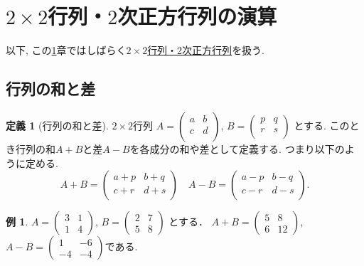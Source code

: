 \documentclass[dvipdfmx,a4paper,11pt]{article}
\theoremstyle{definition}
\newtheorem{dfn}[thm]{定義}
\newtheorem{exa}[thm]{例}
\begin{document}
\section{$2 \times 2$行列・$2$次正方行列の演算}
\label{sec-2}


以下, この\ref{sec-2}章ではしばらく\underline{$2 \times 2$行列・2次正方行列}を扱う. 

\subsection{行列の和と差}

 \begin{tcolorbox}[
    colback = white,
    colframe = green!35!black,
    fonttitle = \bfseries,
    breakable = true]
    \begin{dfn}[行列の和と差]
    \text{}
 
$2 \times 2$行列
$
A=\begin{pmatrix}
a& b \\
c& d \\
\end{pmatrix}
$, 
$
B=\begin{pmatrix}
p& q \\
r& s\\
\end{pmatrix}
$
とする.
このとき行列の和$A+B$と差$A-B$を各成分の和や差として定義する.
つまり以下のように定める. 
$$
A+B=
\begin{pmatrix}
a +p& b +q\\
c+r& d+s \\
\end{pmatrix}
\quad
A-B=
\begin{pmatrix}
a -p& b -q\\
c-r & d-s \\
\end{pmatrix}.
$$
  \end{dfn}
 \end{tcolorbox}
 

\begin{exa}
 $A = 
 \begin{pmatrix}
 3&1 \\
 1&4
 \end{pmatrix}
 $, 
 $
 B = 
 \begin{pmatrix}
 2&7\\
 5&8
 \end{pmatrix}
 $
 とする．
$
 A+B =
 \begin{pmatrix}
 5&8 \\
6&12
 \end{pmatrix}
 $, 
 $
  A-B =
 \begin{pmatrix}
 1&-6 \\
 -4&-4
 \end{pmatrix}
 $である.
 \end{exa}
\end{document}
